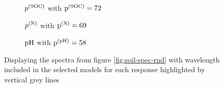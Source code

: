 	\begin{figure}[H]
		\begin{subfigure}[b]{\textwidth}
			\centering
			
			\caption{$p^{(\mathrm{SOC})}$ with $\mathrm{p}^{(\mathrm{SOC})} = 72$}
			\label{sfig:calib-soc}
		\end{subfigure}

		\begin{subfigure}[b]{\textwidth}
			\centering
			
			\caption{$p^{(\mathrm{N})}$ with $\mathrm{p}^{(\mathrm{N})} = 69$}
			\label{sfig:calib-n}
		\end{subfigure}

		\begin{subfigure}[b]{\textwidth}
			\centering
			
			\caption{$\mathrm{pH}$ with $\mathrm{p}^{(\mathrm{pH})} = 58$}
			\label{sfig:calib-ph}
		\end{subfigure}
		\caption{Displaying the spectra from figure \ref{fig:soil-spec-rnd} with wavelength included in the selected models for each response highlighted by vertical grey lines}
	\end{figure}

